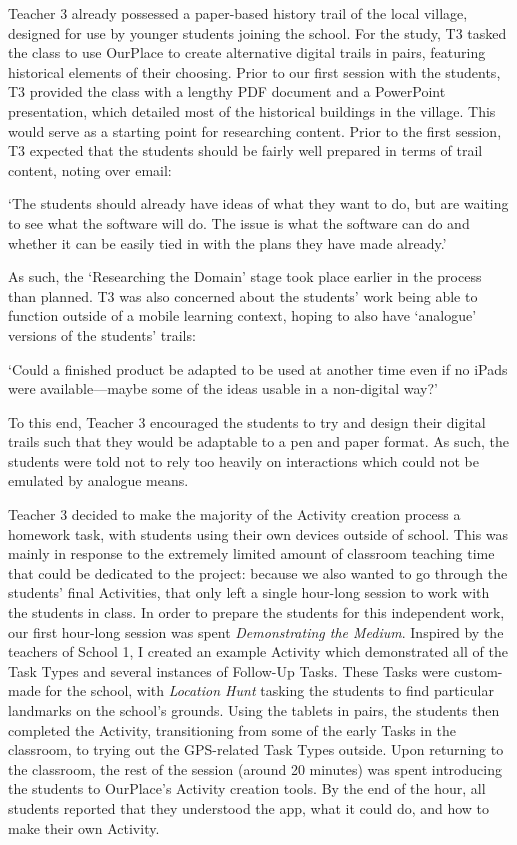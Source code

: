 Teacher 3 already possessed a paper-based history trail of the local village, designed for use by younger students joining the school. For the study, T3 tasked the class to use OurPlace to create alternative digital trails in pairs, featuring historical elements of their choosing. Prior to our first session with the students, T3 provided the class with a lengthy PDF document and a PowerPoint presentation, which detailed most of the historical buildings in the village. This would serve as a starting point for researching content. Prior to the first session, T3 expected that the students should be fairly well prepared in terms of trail content, noting over email: 

\begin{displayquote}
`The students should already have ideas of what they want to do, but are waiting to see what the software will do. The issue is what the software can do and whether it can be easily tied in with the plans they have made already.'
\end{displayquote}

As such, the `Researching the Domain' stage took place earlier in the process than planned. T3 was also concerned about the students' work being able to function outside of a mobile learning context, hoping to also have `analogue' versions of the students' trails: 

\begin{displayquote}
`Could a finished product be adapted to be used at another time even if no iPads were available---maybe some of the ideas usable in a non-digital way?'
\end{displayquote}

To this end, Teacher 3 encouraged the students to try and design their digital trails such that they would be adaptable to a pen and paper format. As such, the students were told not to rely too heavily on interactions which could not be emulated by analogue means.

Teacher 3 decided to make the majority of the Activity creation process a homework task, with students using their own devices outside of school. This was mainly in response to the extremely limited amount of classroom teaching time that could be dedicated to the project: because we also wanted to go through the students' final Activities, that only left a single hour-long session to work with the students in class. In order to prepare the students for this independent work, our first hour-long session was spent \textit{Demonstrating the Medium}. Inspired by the teachers of School 1, I created an example Activity which demonstrated all of the Task Types and several instances of Follow-Up Tasks. These Tasks were custom-made for the school, with \textit{Location Hunt} tasking the students to find particular landmarks on the school's grounds. Using the tablets in pairs, the students then completed the Activity, transitioning from some of the early Tasks in the classroom, to trying out the GPS-related Task Types outside. Upon returning to the classroom, the rest of the session (around 20 minutes) was spent introducing the students to OurPlace's Activity creation tools. By the end of the hour, all students reported that they understood the app, what it could do, and how to make their own Activity.

